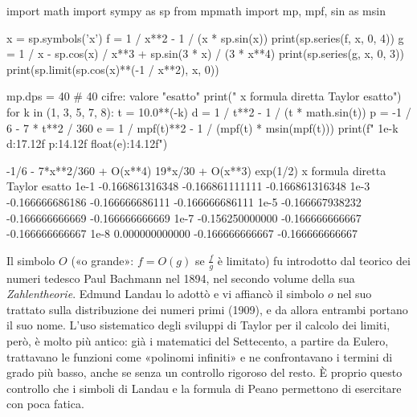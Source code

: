 \begin{python}
import math
import sympy as sp
from mpmath import mp, mpf, sin as msin

x = sp.symbols('x')
f = 1 / x**2 - 1 / (x * sp.sin(x))
print(sp.series(f, x, 0, 4))
g = 1 / x - sp.cos(x) / x**3 + sp.sin(3 * x) / (3 * x**4)
print(sp.series(g, x, 0, 3))
print(sp.limit(sp.cos(x)**(-1 / x**2), x, 0))

mp.dps = 40                         # 40 cifre: valore "esatto"
print("     x      formula diretta      Taylor       esatto")
for k in (1, 3, 5, 7, 8):
    t = 10.0**(-k)
    d = 1 / t**2 - 1 / (t * math.sin(t))
    p = -1 / 6 - 7 * t**2 / 360
    e = 1 / mpf(t)**2 - 1 / (mpf(t) * msin(mpf(t)))
    print(f"  1e-{k}  {d:17.12f}  {p:14.12f}  {float(e):14.12f}")
\end{python}
\begin{risultato}
-1/6 - 7*x**2/360 + O(x**4)
19*x/30 + O(x**3)
exp(1/2)
     x      formula diretta      Taylor       esatto
  1e-1    -0.166861316348  -0.166861111111  -0.166861316348
  1e-3    -0.166666686186  -0.166666686111  -0.166666686111
  1e-5    -0.166667938232  -0.166666666669  -0.166666666669
  1e-7    -0.156250000000  -0.166666666667  -0.166666666667
  1e-8     0.000000000000  -0.166666666667  -0.166666666667
\end{risultato}

\begin{notastorica}
Il simbolo $O$ («o grande»: $f=O(g)$ se $\frac fg$ è limitato) fu introdotto dal teorico dei
numeri tedesco Paul Bachmann nel 1894, nel secondo volume della sua \emph{Zahlentheorie}.
Edmund Landau lo adottò e vi affiancò il simbolo $o$ nel suo trattato sulla distribuzione
dei numeri primi (1909), e da allora entrambi portano il suo nome. L'uso sistematico
degli sviluppi di Taylor per il calcolo dei limiti, però, è molto più antico: già i
matematici del Settecento, a partire da Eulero, trattavano le funzioni come «polinomi
infiniti» e ne confrontavano i termini di grado più basso, anche se senza un controllo
rigoroso del resto. È proprio questo controllo che i simboli di Landau e la formula di
Peano permettono di esercitare con poca fatica.
\end{notastorica}
